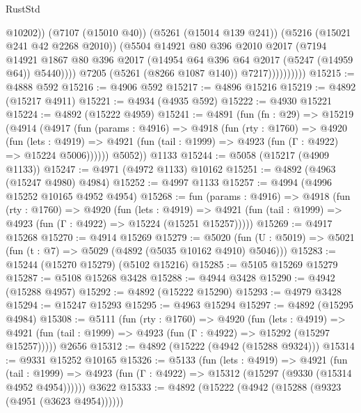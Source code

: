 \begin{lexlean}{RustStd}
\begin{coremodule}
                              @10202))
                          (@7107 (@15010 @40))
                          (@5261 (@15014 @139 @241))
                          (@5216 (@15021 @241 @42 @2268 @2010))
                          (@5504
                            @14921
                            @80
                            @396
                            @2010
                            @2017
                            (@7194
                              @14921
                              @1867
                              @80
                              @396
                              @2017
                              (@14954 @64 @396 @64 @2017 (@5247 (@14959 @64)) @5440))))
                        @7205
                        (@5261 (@8266 @1087 @140))
                        @7217))))))))))
@15215 := @4888 @592
@15216 := @4906 @592
@15217 := @4896 @15216
@15219 := @4892 (@15217 @4911)
@15221 := @4934 (@4935 @592)
@15222 := @4930 @15221
@15224 := @4892 (@15222 @4959)
@15241 := @4891
    (fun (fn : @29) =>
    @15219
      (@4914
        (@4917
          (fun (params : @4916) =>
          @4918
            (fun (rty : @1760) =>
            @4920
              (fun (lets : @4919) =>
              @4921 (fun (tail : @1999) => @4923 (fun (Γ : @4922) => @15224 @5006))))))
        @5052))
    @1133
@15244 := @5058 (@15217 (@4909 @1133))
@15247 := @4971 (@4972 @1133) @10162
@15251 := @4892 (@4963 (@15247 @4980) @4984)
@15252 := @4997 @1133
@15257 := @4994 (@4996 @15252 @10165 @4952 @4954)
@15268 := fun (params : @4916) =>
  @4918
    (fun (rty : @1760) =>
    @4920
      (fun (lets : @4919) =>
      @4921 (fun (tail : @1999) => @4923 (fun (Γ : @4922) => @15224 (@15251 @15257)))))
@15269 := @4917 @15268
@15270 := @4914 @15269
@15279 := @5020
    (fun (U : @5019) => @5021 (fun (t : @7) => @5029 (@4892 (@5035 @10162 @4910) @5046)))
@15283 := @15244 (@15270 @15279) (@5102 @15216)
@15285 := @5105 @15269 @15279
@15287 := @5108 @15268 @3428
@15288 := @4944 @3428
@15290 := @4942 (@15288 @4957)
@15292 := @4892 (@15222 @15290)
@15293 := @4979 @3428
@15294 := @15247 @15293
@15295 := @4963 @15294
@15297 := @4892 (@15295 @4984)
@15308 := @5111
    (fun (rty : @1760) =>
    @4920
      (fun (lets : @4919) =>
      @4921 (fun (tail : @1999) => @4923 (fun (Γ : @4922) => @15292 (@15297 @15257)))))
    @2656
@15312 := @4892 (@15222 (@4942 (@15288 @9324)))
@15314 := @9331 @15252 @10165
@15326 := @5133
    (fun (lets : @4919) =>
    @4921
      (fun (tail : @1999) =>
      @4923 (fun (Γ : @4922) => @15312 (@15297 (@9330 (@15314 @4952 @4954))))))
    @3622
@15333 := @4892 (@15222 (@4942 (@15288 (@9323 (@4951 (@3623 @4954))))))

\end{coremodule}
\end{lexlean}
